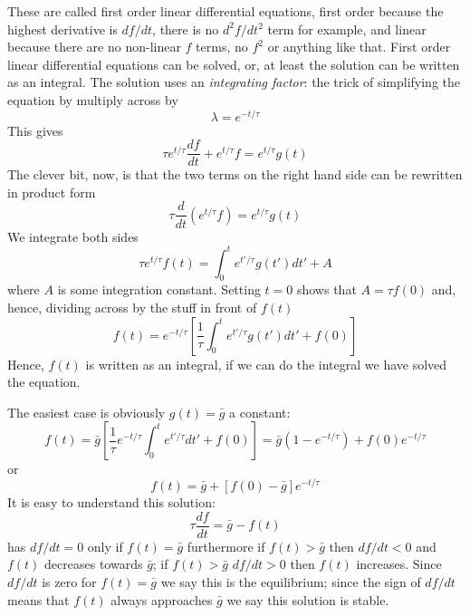 \documentclass{article}
\begin{document}
These are called first order linear differential equations, first
order because the highest derivative is $df/dt$, there is no
$d^2f/dt^2$ term for example, and linear because there are no
non-linear $f$ terms, no $f^2$ or anything like that. First order
linear differential equations can be solved, or, at least the solution
can be written as an integral. The solution uses an
\textsl{integrating factor}: the trick of simplifying the equation by
multiply across by
\begin{equation}
\lambda=e^{-t/\tau}
\end{equation}
This gives
\begin{equation}
\tau e^{t/\tau}\frac{df}{dt}+e^{t/\tau}f=e^{t/\tau}g(t)
\end{equation}
The clever bit, now, is that the two terms on the right hand side can
be rewritten in product form
\begin{equation}
\tau \frac{d}{dt}\left(e^{t/\tau}f\right)=e^{t/\tau}g(t)
\end{equation}
We integrate both sides
\begin{equation}
\tau e^{t/\tau}f(t)=\int_0^t e^{t'/\tau} g(t')dt'+A
\end{equation}
where $A$ is some integration constant. Setting $t=0$ shows that $A=\tau f(0)$ and, hence, dividing across by the stuff in front of $f(t)$
\begin{equation}
f(t)=e^{-t/\tau}\left[\frac{1}{\tau}\int_0^t e^{t'/\tau} g(t')dt'+f(0)\right]
\end{equation}
Hence, $f(t)$ is written as an integral, if we can do the integral we
have solved the equation.

The easiest case is obviously $g(t)=\bar{g}$ a constant:
\begin{equation}
f(t)= \bar{g} \left[\frac{1}{\tau}e^{-t/\tau}\int_0^t e^{t'/\tau}dt'+f(0)\right]=\bar{g}\left(1-e^{-t/\tau}\right) + f(0)e^{-t/\tau}
\end{equation}
or
\begin{equation}
f(t)=\bar{g}+[f(0)-\bar{g}]e^{-t/\tau}
\end{equation}
It is easy to understand this solution: 
\begin{equation}
\tau\frac{df}{dt}=\bar{g}-f(t)
\end{equation}
has $df/dt=0$ only if $f(t)=\bar{g}$ furthermore if $f(t)>\bar{g}$
then $df/dt<0$ and $f(t)$ decreases towards $\bar{g}$; if
$f(t)>\bar{g}$ $df/dt>0$ then $f(t)$ increases. Since $df/dt$ is zero
for $f(t)=\bar{g}$ we say this is the equilibrium; since the sign of
$df/dt$ means that $f(t)$ always approaches $\bar{g}$ we say this
solution is stable.
\end{document}
